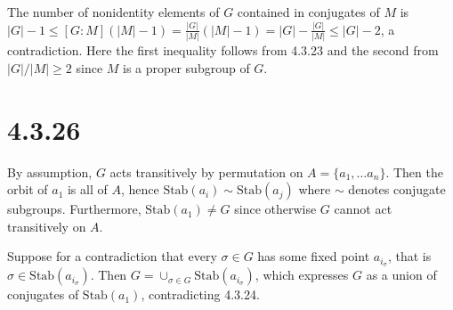 \documentclass{article}
\def\Stab{\textrm{Stab}}
\begin{document}
The number of nonidentity elements of $G$ contained in conjugates of $M$ is $|G| - 1 \le [G:M] (|M|-1) = \frac{|G|}{|M|}(|M|-1) = |G| - \frac{|G|}{|M|} \le |G| - 2$, a contradiction. Here the first inequality follows from 4.3.23 and the second from $|G| / |M| \ge 2$ since $M$ is a proper subgroup of $G$.

\section*{4.3.26}

By assumption, $G$ acts transitively by permutation on $A = \{a_1, \ldots a_n\}$. Then the orbit of $a_1$ is all of $A$, hence $\Stab(a_i) \sim \Stab(a_j)$ where $\sim$ denotes conjugate subgroups. Furthermore, $\Stab(a_1) \ne G$ since otherwise $G$ cannot act transitively on $A$.

Suppose for a contradiction that every $\sigma \in G$ has some fixed point $a_{i_\sigma}$, that is $\sigma \in \Stab(a_{i_\sigma})$. Then $G = \cup_{\sigma \in G} \Stab(a_{i_\sigma})$, which expresses $G$ as a union of conjugates of $\Stab(a_1)$, contradicting 4.3.24.
\end{document}
